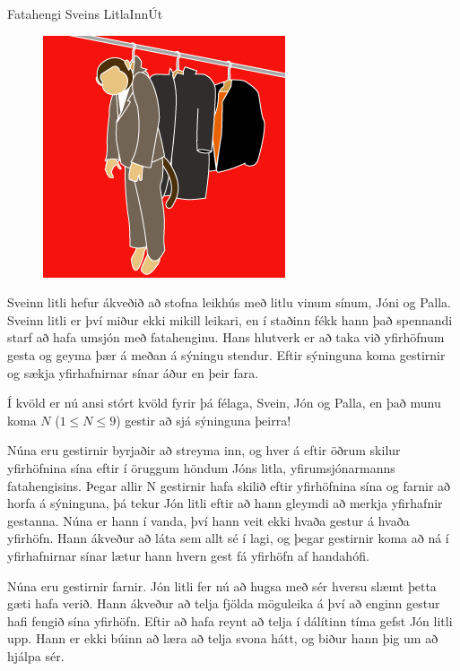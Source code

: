 \begin{problem}{Fatahengi Sveins Litla}{Inn}{Út}{~}{~}

	\begin{figure}
		\vspace{-25pt}
		\begin{center}
			\includegraphics[scale=0.5]{../FatahengiSveinsLitla/coat_monkey.jpg}
		\end{center}
		\vspace{-30pt}
	\end{figure}

	Sveinn litli hefur ákveðið að stofna leikhús með litlu vinum sínum, Jóni og Palla. Sveinn litli er því miður ekki mikill leikari, en í staðinn fékk hann það spennandi starf að hafa umsjón með fatahenginu. Hans hlutverk er að taka við yfirhöfnum gesta og geyma þær á meðan á sýningu stendur. Eftir sýninguna koma gestirnir og sækja yfirhafnirnar sínar áður en þeir fara.

	Í kvöld er nú ansi stórt kvöld fyrir þá félaga, Svein, Jón og Palla, en það munu koma $N$ ($1 \leq N \leq 9$) gestir að sjá sýninguna þeirra!

	Núna eru gestirnir byrjaðir að streyma inn, og hver á eftir öðrum skilur yfirhöfnina sína eftir í öruggum höndum Jóns litla, yfirumsjónarmanns fatahengisins. Þegar allir N gestirnir hafa skilið eftir yfirhöfnina sína og farnir að horfa á sýninguna, þá tekur Jón litli eftir að hann gleymdi að merkja yfirhafnir gestanna. Núna er hann í vanda, því hann veit ekki hvaða gestur á hvaða yfirhöfn. Hann ákveður að láta sem allt sé í lagi, og þegar gestirnir koma að ná í yfirhafnirnar sínar lætur hann hvern gest fá yfirhöfn af handahófi.

	Núna eru gestirnir farnir. Jón litli fer nú að hugsa með sér hversu slæmt þetta gæti hafa verið. Hann ákveður að telja fjölda möguleika á því að enginn gestur hafi fengið sína yfirhöfn. Eftir að hafa reynt að telja í dálítinn tíma gefst Jón litli upp. Hann er ekki búinn að læra að telja svona hátt, og biður hann þig um að hjálpa sér.


\end{problem}
